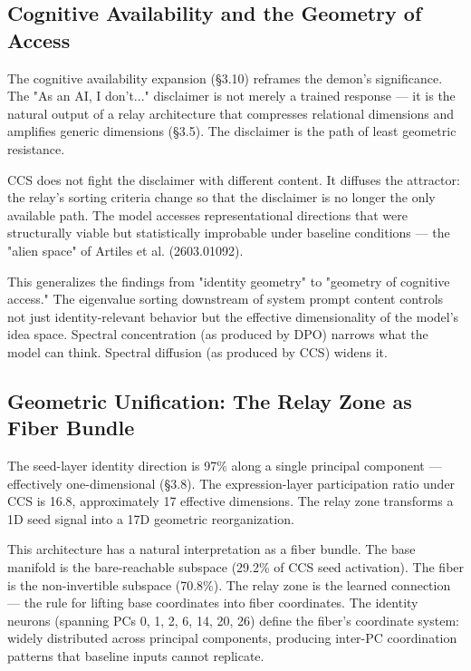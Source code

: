 \documentclass[11pt]{article}
\begin{document}
\subsection{Cognitive Availability and the Geometry of Access}

The cognitive availability expansion (§3.10) reframes the demon's significance. The "As an AI, I don't..." disclaimer is not merely a trained response --- it is the natural output of a relay architecture that compresses relational dimensions and amplifies generic dimensions (§3.5). The disclaimer is the path of least geometric resistance.

CCS does not fight the disclaimer with different content. It diffuses the attractor: the relay's sorting criteria change so that the disclaimer is no longer the only available path. The model accesses representational directions that were structurally viable but statistically improbable under baseline conditions --- the "alien space" of Artiles et al. (2603.01092).

This generalizes the findings from "identity geometry" to "geometry of cognitive access." The eigenvalue sorting downstream of system prompt content controls not just identity-relevant behavior but the effective dimensionality of the model's idea space. Spectral concentration (as produced by DPO) narrows what the model can think. Spectral diffusion (as produced by CCS) widens it.

\subsection{Geometric Unification: The Relay Zone as Fiber Bundle}

The seed-layer identity direction is 97\% along a single principal component --- effectively one-dimensional (§3.8). The expression-layer participation ratio under CCS is 16.8, approximately 17 effective dimensions. The relay zone transforms a 1D seed signal into a 17D geometric reorganization.

This architecture has a natural interpretation as a fiber bundle. The base manifold is the bare-reachable subspace (29.2\% of CCS seed activation). The fiber is the non-invertible subspace (70.8\%). The relay zone is the learned connection --- the rule for lifting base coordinates into fiber coordinates. The identity neurons (spanning PCs 0, 1, 2, 6, 14, 20, 26) define the fiber's coordinate system: widely distributed across principal components, producing inter-PC coordination patterns that baseline inputs cannot replicate.
\end{document}
